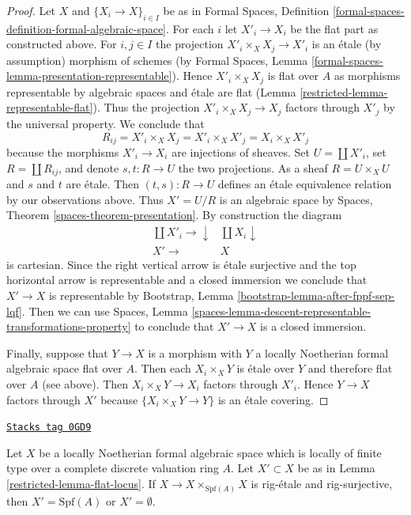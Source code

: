 \begin{proof}
\medskip\noindent
Let $X$ and $\{X_i \to X\}_{i \in I}$ be as in
Formal Spaces, Definition
\ref{formal-spaces-definition-formal-algebraic-space}.
For each $i$ let $X'_i \to X_i$ be the flat part as
constructed above. For $i, j \in I$ the projection
$X'_i \times_X X_j \to X'_i$ is an \'etale (by assumption)
morphism of schemes (by Formal Spaces, Lemma
\ref{formal-spaces-lemma-presentation-representable}).
Hence $X'_i \times_X X_j$ is flat over $A$ as morphisms
representable by algebraic spaces and \'etale
are flat (Lemma \ref{restricted-lemma-representable-flat}).
Thus the projection $X'_i \times_X X_j \to X_j$ factors
through $X'_j$ by the universal property. We conclude that
$$
R_{ij} = X'_i \times_X X_j = X'_i \times_X X'_j = X_i \times_X X'_j
$$
because the morphisms $X'_i \to X_i$ are injections of sheaves.
Set $U = \coprod X'_i$, set
$R = \coprod R_{ij}$, and denote $s, t : R \to U$ the two
projections. As a sheaf $R = U \times_X U$ and $s$ and $t$
are \'etale. Then $(t, s) : R \to U$ defines an \'etale equivalence
relation by our observations above. Thus $X' = U/R$ is an
algebraic space by Spaces, Theorem \ref{spaces-theorem-presentation}.
By construction the diagram
$$
\begin{array}{cc}\coprod X'_i \longrightarrow\downarrow & \coprod X_i \downarrow \\ X' \longrightarrow & X\end{array}
$$
is cartesian. Since the right vertical arrow is \'etale surjective
and the top horizontal arrow is representable and a closed immersion
we conclude that $X' \to X$ is representable by
Bootstrap, Lemma \ref{bootstrap-lemma-after-fppf-sep-lqf}.
Then we can use Spaces, Lemma
\ref{spaces-lemma-descent-representable-transformations-property}
to conclude that $X' \to X$ is a closed immersion.

\medskip\noindent
Finally, suppose that $Y \to X$ is a morphism with
$Y$ a locally Noetherian formal algebraic space flat over $A$.
Then each $X_i \times_X Y$ is \'etale over $Y$ and
therefore flat over $A$ (see above).
Then $X_i \times_X Y \to X_i$ factors through $X'_i$.
Hence $Y \to X$ factors through $X'$ because
$\{X_i \times_X Y \to Y\}$ is an \'etale covering.
\end{proof}

\begin{lemma}
\label{restricted-lemma-flat-and-diagonal-rig-surjective}
\href{https://stacks.math.columbia.edu/tag/0GD9}{\texttt{Stacks tag 0GD9}}

Let $X$ be a locally Noetherian formal algebraic space which is
locally of finite type over a complete discrete valuation ring $A$.
Let $X' \subset X$ be as in Lemma \ref{restricted-lemma-flat-locus}.
If $X \to X \times_{\text{Spf}(A)} X$ is rig-\'etale and rig-surjective,
then $X' = \text{Spf}(A)$ or $X' = \emptyset$.
\end{lemma}

